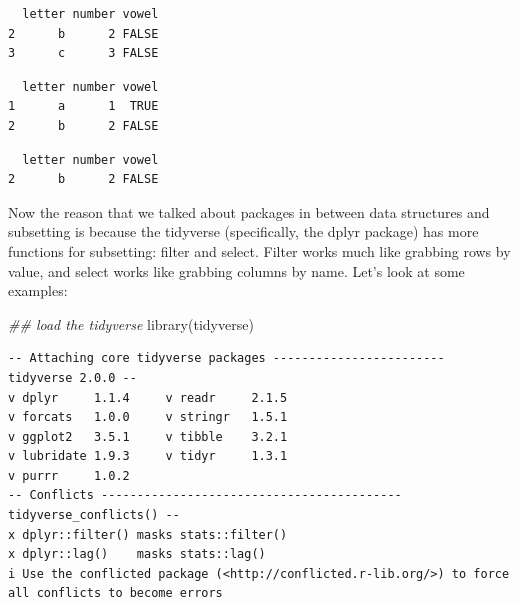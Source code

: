 \documentclass[
  letterpaper,
  DIV=11,
  numbers=noendperiod]{scrreprt}
\newenvironment{Shaded}{\begin{snugshade}}{\end{snugshade}}
\newcommand{\ConstantTok}[1]{\textcolor[rgb]{0.56,0.35,0.01}{#1}}
\newcommand{\DecValTok}[1]{\textcolor[rgb]{0.68,0.00,0.00}{#1}}
\newcommand{\DocumentationTok}[1]{\textcolor[rgb]{0.37,0.37,0.37}{\textit{#1}}}
\newcommand{\FunctionTok}[1]{\textcolor[rgb]{0.28,0.35,0.67}{#1}}
\newcommand{\NormalTok}[1]{\textcolor[rgb]{0.00,0.23,0.31}{#1}}
\newcommand{\SpecialCharTok}[1]{\textcolor[rgb]{0.37,0.37,0.37}{#1}}
\begin{document}
\begin{verbatim}
  letter number vowel
2      b      2 FALSE
3      c      3 FALSE
\end{verbatim}

\begin{Shaded}
\end{Shaded}

\begin{verbatim}
  letter number vowel
1      a      1  TRUE
2      b      2 FALSE
\end{verbatim}

\begin{Shaded}
\end{Shaded}

\begin{verbatim}
  letter number vowel
2      b      2 FALSE
\end{verbatim}

Now the reason that we talked about packages in between data structures
and subsetting is because the tidyverse (specifically, the dplyr
package) has more functions for subsetting: filter and select. Filter
works much like grabbing rows by value, and select works like grabbing
columns by name. Let's look at some examples:

\begin{Shaded}
\begin{Highlighting}[]
\DocumentationTok{\#\# load the tidyverse}
\FunctionTok{library}\NormalTok{(tidyverse)}
\end{Highlighting}
\end{Shaded}

\begin{verbatim}
-- Attaching core tidyverse packages ------------------------ tidyverse 2.0.0 --
v dplyr     1.1.4     v readr     2.1.5
v forcats   1.0.0     v stringr   1.5.1
v ggplot2   3.5.1     v tibble    3.2.1
v lubridate 1.9.3     v tidyr     1.3.1
v purrr     1.0.2     
-- Conflicts ------------------------------------------ tidyverse_conflicts() --
x dplyr::filter() masks stats::filter()
x dplyr::lag()    masks stats::lag()
i Use the conflicted package (<http://conflicted.r-lib.org/>) to force all conflicts to become errors
\end{verbatim}
\end{document}
